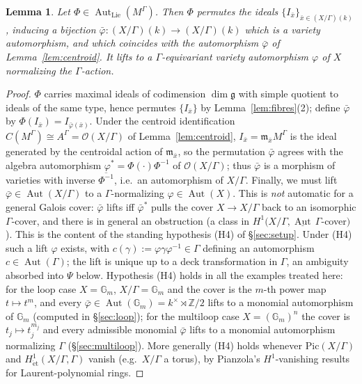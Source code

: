 \documentclass{amsart}
\newtheorem{lemma}{Lemma}
\theoremstyle{definition}
\DeclareMathOperator{\Aut}{Aut}
\newcommand{\Gm}{\mathbb{G}_m}
\newcommand{\g}{\mathfrak{g}}
\newcommand{\OO}{\mathcal{O}}
\newcommand{\Z}{\mathbb{Z}}
\newcommand{\M}{M}
\begin{document}
\begin{lemma}\label{lem:varietypart}
Let $\Phi\in\Aut_{\mathrm{Lie}}(\M^\Gamma)$.  Then $\Phi$ permutes the
ideals $\{I_{\bar x}\}_{\bar x\in (X/\Gamma)(k)}$, inducing a bijection
$\bar\varphi\colon(X/\Gamma)(k)\to(X/\Gamma)(k)$ which is a variety
automorphism, and which coincides with the automorphism $\bar\varphi$ of
Lemma~\ref{lem:centroid}.  It lifts to a $\Gamma$-equivariant variety
automorphism $\varphi$ of $X$ normalizing the $\Gamma$-action.
\end{lemma}
\begin{proof}
$\Phi$ carries maximal ideals of codimension $\dim\g$ with simple quotient
to ideals of the same type, hence permutes $\{I_{\bar x}\}$ by
Lemma~\ref{lem:fibres}(2); define $\bar\varphi$ by
$\Phi(I_{\bar x})=I_{\bar\varphi(\bar x)}$.  Under the centroid
identification $C(\M^\Gamma)\cong A^\Gamma=\OO(X/\Gamma)$ of
Lemma~\ref{lem:centroid}, $I_{\bar x}=\mathfrak m_{\bar x}\M^\Gamma$ is the
ideal generated by the centroidal action of $\mathfrak m_{\bar x}$, so the
permutation $\bar\varphi$ agrees with the algebra automorphism
$\varphi^*=\Phi(\cdot)\Phi^{-1}$ of $\OO(X/\Gamma)$; thus $\bar\varphi$ is
a morphism of varieties with inverse $\overline{\Phi^{-1}}$, i.e.\ an
automorphism of $X/\Gamma$.  Finally, we must lift $\bar\varphi\in\Aut(X/\Gamma)$ to a
$\Gamma$-normalizing $\varphi\in\Aut(X)$.  This is \emph{not} automatic for
a general Galois cover: $\bar\varphi$ lifts iff $\bar\varphi^*$ pulls the
cover $X\to X/\Gamma$ back to an isomorphic $\Gamma$-cover, and there is in
general an obstruction (a class in $H^1(X/\Gamma,\underline{\Aut}\,\Gamma$-cover$)$).
This is the content of the standing hypothesis (H4) of \S\ref{sec:setup}.
Under (H4) such a lift $\varphi$ exists, with
$c(\gamma):=\varphi\gamma\varphi^{-1}\in\Gamma$ defining an automorphism
$c\in\Aut(\Gamma)$; the lift is unique up to a deck transformation in
$\Gamma$, an ambiguity absorbed into $\Psi$ below.  Hypothesis (H4) holds
in all the examples treated here: for the loop case $X=\Gm$, $X/\Gamma=\Gm$
and the cover is the $m$-th power map $t\mapsto t^m$, and every
$\bar\varphi\in\Aut(\Gm)=k^\times\rtimes\Z/2$ lifts to a monomial
automorphism of $\Gm$ (computed in \S\ref{sec:loop}); for the multiloop
case $X=(\Gm)^n$ the cover is $t_j\mapsto t_j^{m_j}$ and every admissible
monomial $\bar\varphi$ lifts to a monomial automorphism normalizing
$\Gamma$ (\S\ref{sec:multiloop}).  More generally (H4) holds whenever
$\mathrm{Pic}(X/\Gamma)$ and $H^1_{\mathrm{\acute et}}(X/\Gamma,\Gamma)$
vanish (e.g.\ $X/\Gamma$ a torus), by Pianzola's $H^1$-vanishing results
for Laurent-polynomial rings.
\end{proof}
\end{document}
